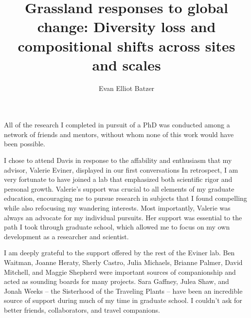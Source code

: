\documentclass[twoside,12pt,final]{ucthesis-CA2012}
\begin{document}
\begin{ucfrontmatter}


  \title{Grassland responses to global change: Diversity loss and compositional shifts across sites and scales}
  \author{Evan Elliot Batzer}

   
  \othermemberC{} %
  
	\maketitle
	

  
\begin{acknowledgements}
    All of the research I completed in pursuit of a PhD was conducted among a network of friends and mentors, without whom none of this work would have been possible.

    I chose to attend Davis in response to the affability and enthusiasm that my advisor, Valerie Eviner, displayed in our first conversations In retrospect, I am very fortunate to have joined a lab that emphasized both scientific rigor and personal growth. Valerie's support was crucial to all elements of my graduate education, encouraging me to pursue research in subjects that I found compelling while also refocusing my wandering interests. Most importantly, Valerie was always an advocate for my individual pursuits. Her support was essential to the path I took through graduate school, which allowed me to focus on my own development as a researcher and scientist.

    I am deeply grateful to the support offered by the rest of the Eviner lab. Ben Waitman, Joanne Heraty, Sherly Castro, Julia Michaels, Brianne Palmer, David Mitchell, and Maggie Shepherd were important sources of companionship and acted as sounding boards for many projects. Sara Gaffney, Julea Shaw, and Jonah Weeks -- the Sisterhood of the Traveling Plants -- have been an incredible source of support during much of my time in graduate school. I couldn't ask for better friends, collaborators, and travel companions.


\end{acknowledgements}
\end{ucfrontmatter}
\end{document}
